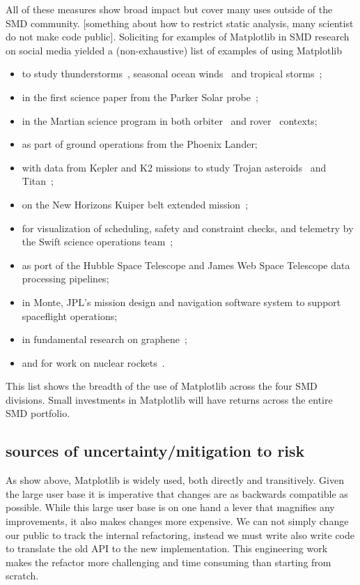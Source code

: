 \documentclass[12pt]{article}
\numberwithin{page}{section}
\begin{document}
All of these measures show broad impact but cover many uses outside of
the SMD community.  [something about how to restrict static analysis,
  many scientist do not make code public].  Soliciting for examples of
Matplotlib in SMD research on social media yielded a (non-exhaustive)
list of examples of using Matplotlib
\begin{itemize}
\item
  to study
  thunderstorms~\cite{https://doi.org/10.1002/2016JD025299,https://doi.org/10.1029/2019JD030874},
  seasonal ocean winds~\cite{https://doi.org/10.1002/2017JD027516} and
  tropical storms~\cite{Lang_2020};
\item in the first science paper from the Parker Solar
  probe~\cite{Bale2019};
\item in the Martian science program in both
  orbiter~\cite{https://doi.org/10.1029/2019JE006188} and
  rover~\cite{https://doi.org/10.1002/2016EA000219} contexts;
\item as part of ground operations from the Phoenix Lander;
\item with data from Kepler and K2 missions to study Trojan
  asteroids~\cite{Nixon_2019} and
  Titan~\cite{Ryan_2017,2019PASP..131h4505P};
\item on the New Horizons Kuiper belt extended
  mission~\cite{Porter_2018};
\item for visualization of scheduling, safety and constraint checks,
  and telemetry by the Swift science operations
  team~\cite{swift_ops,2020ApJ...900...35T};
\item as port of the Hubble Space Telescope and James Web Space
  Telescope data processing pipelines;
\item in Monte, JPL's mission design
  and navigation software system to support spaceflight operations;
\item in fundamental research on graphene~\cite{PhysRevLett.120.236802};
\item and for work on nuclear rockets~\cite{leu_cerment}.
\end{itemize}
This list shows the breadth of the use of Matplotlib across the
four SMD divisions.  Small investments in Matplotlib will have returns
across the entire SMD portfolio.

\subsection{sources of uncertainty/mitigation to risk}

As show above, Matplotlib is widely used, both directly and
transitively.  Given the large user base it is imperative that changes
are as backwards compatible as possible.  While this large user base
is on one hand a lever that magnifies any improvements, it also makes
changes more expensive.  We can not simply change our public to track
the internal refactoring, instead we must write also write code to
translate the old API to the new implementation.  This engineering work
makes the refactor more challenging and time consuming than starting
from scratch.
\end{document}
